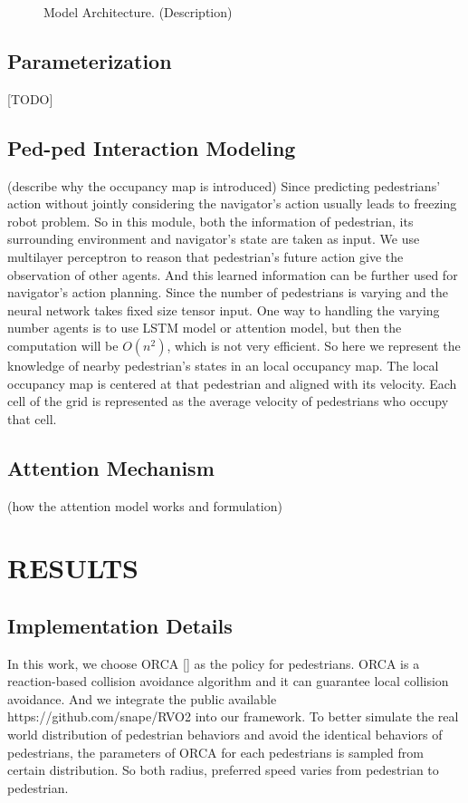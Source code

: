 \documentclass[letterpaper, 10 pt, conference]{ieeeconf}  %
\begin{document}
\begin{figure}[thpb]
  \centering
  \caption{Model Architecture. (Description)}
  \label{figurelabel}
\end{figure}

\subsection{Parameterization}
[TODO]

\subsection{Ped-ped Interaction Modeling}
(describe why the occupancy map is introduced)
Since predicting pedestrians' action without jointly considering the navigator's action usually leads to freezing robot problem. So in this module, both the information of pedestrian, its surrounding environment and navigator's state are taken as input. We use multilayer perceptron to reason that pedestrian's future action give the observation of other agents. And this learned information can be further used for navigator's action planning. Since the number of pedestrians is varying and the neural network takes fixed size tensor input. One way to handling the varying number agents is to use LSTM model or attention model, but then the computation will be $O(n^2)$, which is not very efficient. So here we represent the knowledge of nearby pedestrian's states in an local occupancy map. The local occupancy map is centered at that pedestrian and aligned with its velocity. Each cell of the grid is represented as the average velocity of pedestrians who occupy that cell. 

\subsection{Attention Mechanism}
(how the attention model works and formulation)

\section{RESULTS}

\subsection{Implementation Details}
In this work, we choose ORCA [] as the policy for pedestrians. ORCA is a reaction-based collision avoidance algorithm and it can guarantee local collision avoidance. And we integrate the public available https://github.com/snape/RVO2 into our framework. To better simulate the real world distribution of pedestrian behaviors and avoid the identical behaviors of pedestrians, the parameters of ORCA for each pedestrians is sampled from certain distribution. So both radius, preferred speed varies from pedestrian to pedestrian.
\end{document}
